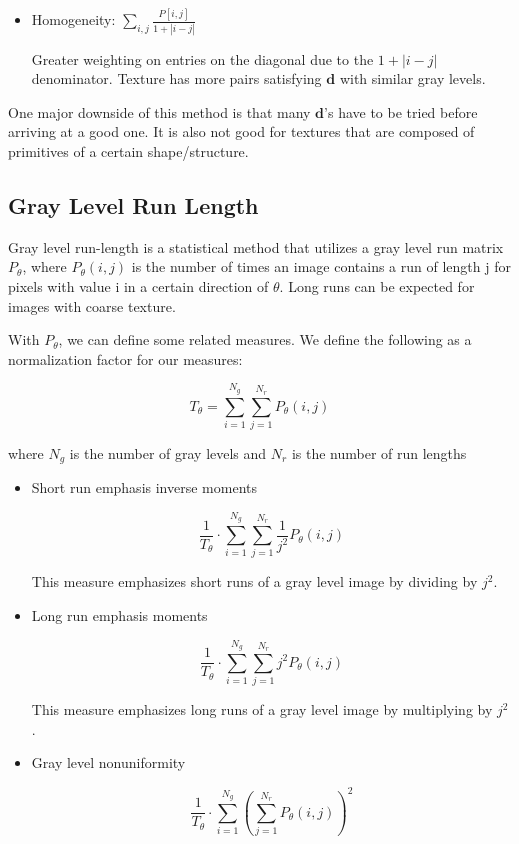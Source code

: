 \documentclass{article}
\begin{document}
\begin{multicols}{3}
\begin{itemize}
\item Homogeneity: $\sum_{i,j} \frac{P[i,j]}{ 1 + | i-j |}$

Greater weighting on entries on the diagonal due to the $1 + |i - j|$ denominator. Texture has more pairs satisfying $\mathbf{d}$ with similar gray levels.

\end{itemize}

One major downside of this method is that many $\mathbf{d}$'s have to be tried before arriving at a good one. It is also not good for textures that are composed of primitives of a certain shape/structure.

\subsection{Gray Level Run Length}

Gray level run-length is a statistical method that utilizes a gray level run matrix $P_\theta$, where $P_\theta(i,j)$ is the number of times an image contains a run of length j for pixels with value i in a certain direction of $\theta$. Long runs can be expected for images with coarse texture.

With $P_\theta$, we can define some related measures. We define the following as a normalization factor for our measures:

$$
T_\theta = \sum_{i=1} ^{N_g} \sum_{j=1} ^{N_r} P_\theta(i,j)
$$

where $N_g$ is the number of gray levels and $N_r$ is the number of run lengths

\begin{itemize}
\itemsep0em
\item {Short run emphasis inverse moments}

$$  
\frac{1}{T_\theta} \cdot \sum_{i=1} ^{N_g} \sum_{j=1} ^{N_r} \frac{1}{j^2}P_\theta (i,j)
$$

This measure emphasizes short runs of a gray level image by dividing by $j^2$.

\item {Long run emphasis moments}
  
$$
\frac{1}{T_\theta} \cdot \sum_{i=1} ^{N_g} \sum_{j=1} ^{N_r} j^2 P_\theta (i,j)
$$

This measure emphasizes long runs of a gray level image by multiplying by $j^2$.

\item {Gray level nonuniformity}
  
$$
\frac{1}{T_\theta} \cdot \sum_{i=1} ^{N_g} \left(\sum_{j=1} ^{N_r} P_\theta (i,j)\right)^2
$$


\end{itemize}
\end{multicols}
\end{document}
